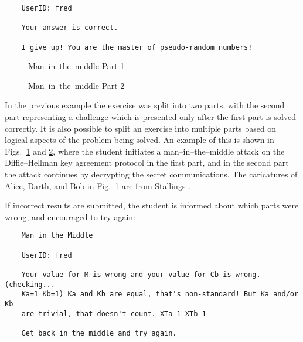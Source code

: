 \documentclass[12pt]{article}
\begin{document}
\begin{verbatim}
    UserID: fred

    Your answer is correct.

    I give up! You are the master of pseudo-random numbers!
\end{verbatim}


\begin{figure}[ht]
\begin{center}
\caption{Man--in--the--middle Part 1}
\label{fig:MITM1}
\end{center}
\end{figure}

\begin{figure}[ht]
\begin{center}
\caption{Man--in--the--middle Part 2}
\label{fig:MITM1-post}
\end{center}
\end{figure}

In the previous example the exercise was split into two parts, with the
second part representing a challenge which is presented only after the
first part is solved correctly.  It is also possible to split an exercise
into multiple parts based on logical aspects of the problem being solved.
An example of this is shown in Figs.\ \ref{fig:MITM1} and \ref{fig:MITM1-post},
where the student initiates a man--in--the--middle attack on the
Diffie--Hellman key agreement protocol in the first part,
and in the second part the attack continues by decrypting the secret communications.
The caricatures of Alice, Darth, and Bob in Fig.\ \ref{fig:MITM1}
are from Stallings \cite{ws5}.

\vspace{11pt}

If incorrect results are submitted, the student is informed about
which parts were wrong, and encouraged to try again:

\begin{verbatim}
    Man in the Middle

    UserID: fred

    Your value for M is wrong and your value for Cb is wrong. (checking...
    Ka=1 Kb=1) Ka and Kb are equal, that's non-standard! But Ka and/or Kb
    are trivial, that doesn't count. XTa 1 XTb 1

    Get back in the middle and try again.
\end{verbatim}
\end{document}
